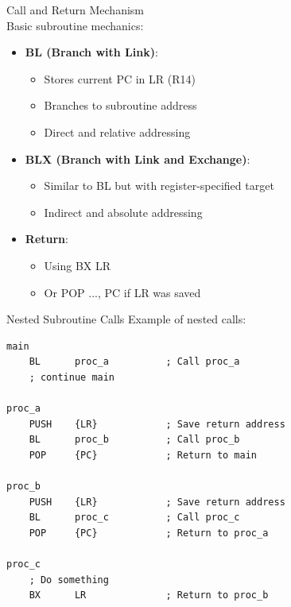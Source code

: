 \begin{concept}{Call and Return Mechanism}\\
Basic subroutine mechanics:
\begin{itemize}
  \item \textbf{BL (Branch with Link)}:
    \begin{itemize}
      \item Stores current PC in LR (R14)
      \item Branches to subroutine address
      \item Direct and relative addressing
    \end{itemize}
  \item \textbf{BLX (Branch with Link and Exchange)}:
    \begin{itemize}
      \item Similar to BL but with register-specified target
      \item Indirect and absolute addressing
    \end{itemize}
  \item \textbf{Return}:
    \begin{itemize}
      \item Using BX LR
      \item Or POP {..., PC} if LR was saved
    \end{itemize}
\end{itemize}
\end{concept}

\begin{example2}{Nested Subroutine Calls}
Example of nested calls:
\begin{lstlisting}[language=armasm, style=base]
main
    BL      proc_a          ; Call proc_a
    ; continue main
    
proc_a
    PUSH    {LR}            ; Save return address
    BL      proc_b          ; Call proc_b
    POP     {PC}            ; Return to main
    
proc_b
    PUSH    {LR}            ; Save return address
    BL      proc_c          ; Call proc_c
    POP     {PC}            ; Return to proc_a
    
proc_c
    ; Do something
    BX      LR              ; Return to proc_b
\end{lstlisting}
\end{example2}

